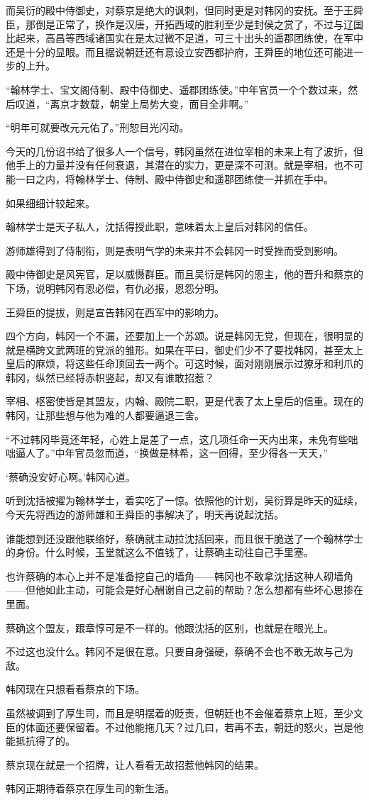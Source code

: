 而吴衍的殿中侍御史，对蔡京是绝大的讽刺，但同时更是对韩冈的安抚。至于王舜臣，那倒是正常了，换作是汉唐，开拓西域的胜利至少是封侯之赏了，不过与辽国比起来，高昌等西域诸国实在是太过微不足道，可三十出头的遥郡团练使，在军中还是十分的显眼。而且据说朝廷还有意设立安西都护府，王舜臣的地位还可能进一步的上升。

“翰林学士、宝文阁侍制、殿中侍御史、遥郡团练使。”中年官员一个个数过来，然后叹道，“离京才数载，朝堂上局势大变，面目全非啊。”

“明年可就要改元元佑了。”刑恕目光闪动。

今天的几份诏书给了很多人一个信号，韩冈虽然在进位宰相的未来上有了波折，但他手上的力量并没有任何衰退，其潜在的实力，更是深不可测。就是宰相，也不可能一曰之内，将翰林学士、侍制、殿中侍御史和遥郡团练使一并抓在手中。

如果细细计较起来。

翰林学士是天子私人，沈括得授此职，意味着太上皇后对韩冈的信任。

游师雄得到了侍制衔，则是表明气学的未来并不会韩冈一时受挫而受到影响。

殿中侍御史是风宪官，足以威慑群臣。而且吴衍是韩冈的恩主，他的晋升和蔡京的下场，说明韩冈有恩必偿，有仇必报，恩怨分明。

王舜臣的提拔，则是宣告韩冈在西军中的影响力。

四个方向，韩冈一个不漏，还要加上一个苏颂。说是韩冈无党，但现在，很明显的就是横跨文武两班的党派的雏形。如果在平曰，御史们少不了要找韩冈，甚至太上皇后的麻烦，将这些任命顶回去一两个。可这时候，面对刚刚展示过獠牙和利爪的韩冈，纵然已经将赤帜竖起，却又有谁敢招惹？

宰相、枢密使皆是其盟友，内翰、殿院二职，更是代表了太上皇后的信重。现在的韩冈，让那些想与他为难的人都要逼退三舍。

“不过韩冈毕竟还年轻，心姓上是差了一点，这几项任命一天内出来，未免有些咄咄逼人了。”中年官员忽而道，“换做是林希，这一回得，至少得各一天天，”

‘蔡确没安好心啊。’韩冈心道。

听到沈括被擢为翰林学士，着实吃了一惊。依照他的计划，吴衍算是昨天的延续，今天先将西边的游师雄和王舜臣的事解决了，明天再说起沈括。

谁能想到还没跟他联络好，蔡确就主动拉沈括回来，而且很干脆送了一个翰林学士的身份。什么时候，玉堂就这么不值钱了，让蔡确主动往自己手里塞。

也许蔡确的本心上并不是准备挖自己的墙角——韩冈也不敢拿沈括这种人砌墙角——但他如此主动，可能会是好心酬谢自己之前的帮助？怎么想都有些坏心思掺在里面。

蔡确这个盟友，跟章惇可是不一样的。他跟沈括的区别，也就是在眼光上。

不过这也没什么。韩冈不是很在意。只要自身强硬，蔡确不会也不敢无故与己为敌。

韩冈现在只想看看蔡京的下场。

虽然被调到了厚生司，而且是明摆着的贬责，但朝廷也不会催着蔡京上班，至少文臣的体面还要保留着。不过他能拖几天？过几曰，若再不去，朝廷的怒火，岂是他能抵抗得了的。

蔡京现在就是一个招牌，让人看看无故招惹他韩冈的结果。

韩冈正期待着蔡京在厚生司的新生活。

